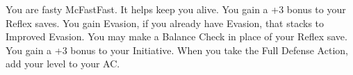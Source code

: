 \combatfeat
{You are fasty McFastFast. It helps keep you alive.}
{You gain a +3 bonus to your Reflex saves.}
{You gain Evasion, if you already have Evasion, that stacks to Improved Evasion.}
{You may make a Balance Check in place of your Reflex save.}
{You gain a +3 bonus to your Initiative.}
{When you take the Full Defense Action, add your level to your AC.}